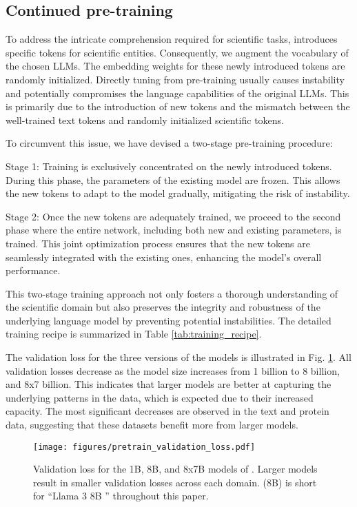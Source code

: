 \subsection{Continued pre-training}
To address the intricate comprehension required for scientific tasks, \ourM{} introduces specific tokens for scientific entities. Consequently, we augment the vocabulary of the chosen LLMs. The embedding weights for these newly introduced tokens are randomly initialized. Directly tuning from pre-training usually causes instability and potentially compromises the language capabilities of the original LLMs. This is primarily due to the introduction of new tokens and the mismatch between the well-trained text tokens and randomly initialized scientific tokens. 

To circumvent this issue, we have devised a two-stage pre-training procedure:

Stage 1: Training is exclusively concentrated on the newly introduced tokens. During this phase, the parameters of the existing model are frozen. This allows the new tokens to adapt to the model gradually, mitigating the risk of instability.

Stage 2: Once the new tokens are adequately trained, we proceed to the second phase where the entire network, including both new and existing parameters, is trained. This joint optimization process ensures that the new tokens are seamlessly integrated with the existing ones, enhancing the model's overall performance.

This two-stage training approach not only fosters a thorough understanding of the scientific domain but also preserves the integrity and robustness of the underlying language model by preventing potential instabilities. The detailed training recipe is summarized in Table \ref{tab:training_recipe}. 


The validation loss for the three versions of the models is illustrated in Fig. \ref{fig:dev_loss}. All validation losses decrease as the model size increases from 1 billion to 8 billion, and 8x7 billion. This indicates that larger models are better at capturing the underlying patterns in the data, which is expected due to their increased capacity. The most significant decreases are observed in the text and protein data, suggesting that these datasets benefit more from larger models.

\begin{figure}[!htbp]
    \centering
    \texttt{[image: figures/pretrain\_validation\_loss.pdf]}
    \caption{Validation loss for the 1B, 8B, and 8x7B models of \ourM{}. Larger models result in smaller validation losses across each domain. \ourM{} (8B) is short for ``Llama 3 8B \ourM{}'' throughout this paper.}
    \label{fig:dev_loss}
\end{figure}

